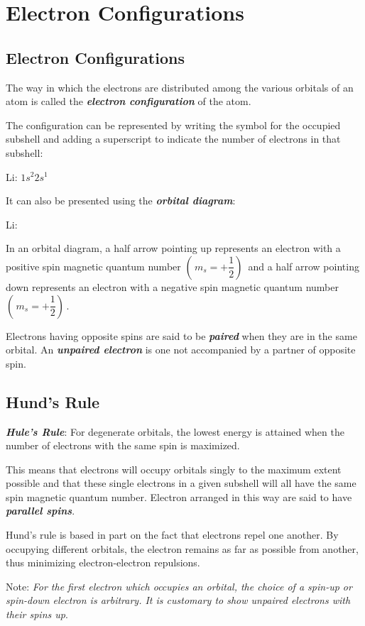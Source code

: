 \documentclass[12pt, a4paper]{report}
\newcommand{\impt}[1]{\textbf{\textit{#1}}}
\newcommand{\hi}{\section}
\newcommand{\hii}{\subsection}
\newcommand{\forb}{\framebox{$\uparrow \downarrow$}}
\newcommand{\horb}{\framebox{$\uparrow \mbox{ }$}}
\begin{document}
\hi{Electron Configurations}
    \hii{Electron Configurations}
        \par The way in which the electrons are distributed among the various orbitals of an atom is
        called the \impt{electron configuration} of the atom.
        \par The configuration can be represented by writing the symbol for the occupied subshell
        and adding a superscript to indicate the number of electrons in that subshell:
        \begin{center}
            Li: $1s^{2} 2 s^{1}$
        \end{center}
        \par It can also be presented using the \impt{orbital diagram}:
        \begin{center}
            Li: \forb \quad \horb
        \end{center}
        \par In an orbital diagram, a half arrow pointing up represents an electron with a positive
        spin magnetic quantum number $(\,m_{s} = +\dfrac{1}{2})\,$ and a half arrow pointing down
        represents an electron with a negative spin magnetic quantum number
        $(\,m_{s} = +\dfrac{1}{2})\,$.
        \par Electrons having opposite spins are said to be \impt{paired} when they are in the same
        orbital. An \impt{unpaired electron} is one not accompanied by a partner of opposite spin.

    \hii{Hund's Rule}
        \par \impt{Hule's Rule}: For degenerate orbitals, the lowest energy is attained when the
        number of electrons with the same spin is maximized.
        \par This means that electrons will occupy orbitals singly to the maximum extent possible
        and that these single electrons in a given subshell will all have the same spin magnetic
        quantum number. Electron arranged in this way are said to have \impt{parallel spins}.
        \par Hund's rule is based in part on the fact that electrons repel one another. By occupying
        different orbitals, the electron remains as far as possible from another, thus minimizing
        electron-electron repulsions.
        \par Note: \textit{For the first electron which occupies an orbital, the choice of a spin-up
        or spin-down electron is arbitrary. It is customary to show unpaired electrons with their
        spins up}.
\end{document}
